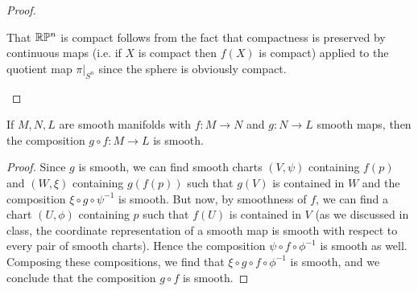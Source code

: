 \documentclass{../../mathnotes}
\begin{document}
\begin{proof}
\begin{enumerate}[(a)]
            That $\mathbb{R}\mathbb{P}^n$ is compact follows from the fact that compactness is preserved by continuous maps (i.e. if $X$ is compact then
            $f(X)$ is compact) applied to the quotient map $\pi|_{S^n}$ since the sphere is obviously compact.
    \end{enumerate}
\end{proof}

\begin{prop}
    If $M, N, L$ are smooth manifolds with $f: M\to N$ and $g:N\to L$ smooth maps, then the composition $g\circ f: M\to L$ is smooth.
\end{prop}
\begin{proof}
    Since $g$ is smooth, we can find smooth charts $(V,\psi)$ containing $f(p)$ and $(W,\xi)$ containing $g(f(p))$ such that
    $g(V)$ is contained in $W$ and the composition $\xi\circ g\circ \psi^{-1}$ is smooth. But now, by smoothness of $f$, we can
    find a chart $(U,\phi)$ containing $p$ such that $f(U)$ is contained in $V$ (as we discussed in class, the coordinate representation
    of a smooth map is smooth with respect to every pair of smooth charts). Hence the composition $\psi\circ f\circ \phi^{-1}$
    is smooth as well. Composing these compositions, we find that $\xi\circ g\circ f\circ \phi^{-1}$ is smooth, and we conclude
    that the composition $g\circ f$ is smooth.
\end{proof}
\end{document}
